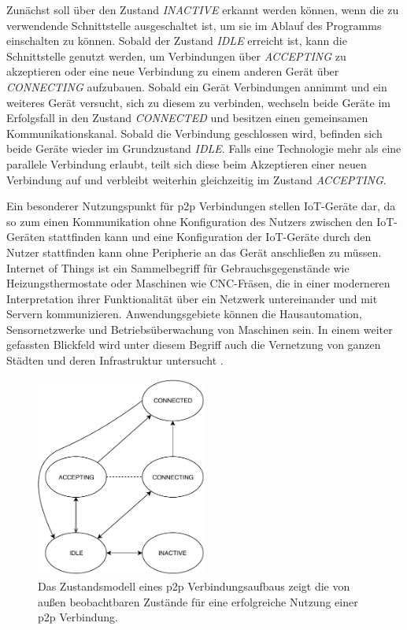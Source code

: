     Zunächst soll über den Zustand {\it INACTIVE} erkannt werden können, wenn die zu verwendende Schnittstelle ausgeschaltet ist, um sie im Ablauf des Programms einschalten zu können. Sobald der Zustand {\it IDLE} erreicht ist, kann die Schnittstelle genutzt werden, um Verbindungen über {\it ACCEPTING} zu akzeptieren oder eine neue Verbindung zu einem anderen Gerät über {\it CONNECTING} aufzubauen. Sobald ein Gerät Verbindungen annimmt und ein weiteres Gerät versucht, sich zu diesem zu verbinden, wechseln beide Geräte im Erfolgsfall in den Zustand {\it CONNECTED} und besitzen einen gemeinsamen Kommunikationskanal. Sobald die Verbindung geschlossen wird, befinden sich beide Geräte wieder im Grundzustand {\it IDLE}. Falls eine Technologie mehr als eine parallele Verbindung erlaubt, teilt sich diese beim Akzeptieren einer neuen Verbindung auf und verbleibt weiterhin gleichzeitig im Zustand {\it ACCEPTING}.

    Ein besonderer Nutzungspunkt für p2p Verbindungen stellen IoT-Geräte dar, da so zum einen Kommunikation ohne Konfiguration des Nutzers zwischen den IoT-Geräten stattfinden kann und eine Konfiguration der IoT-Geräte durch den Nutzer stattfinden kann ohne Peripherie an das Gerät anschließen zu müssen. Internet of Things ist ein Sammelbegriff für Gebrauchsgegenstände wie Heizungsthermostate oder Maschinen wie CNC-Fräsen, die in einer moderneren Interpretation ihrer Funktionalität über ein Netzwerk untereinander und mit Servern kommunizieren. Anwendungsgebiete können die Hausautomation, Sensornetzwerke und Betriebsüberwachung von Maschinen sein. In einem weiter gefassten Blickfeld wird unter diesem Begriff auch die Vernetzung von ganzen Städten und deren Infrastruktur untersucht \cite{ituGroup}.
    
    \begin{figure}[ht]
         \centering
	      \includegraphics[width=0.5\textwidth]{p2p-State.pdf}
    	   \caption[Zustandsmodell eines p2p Verbindungsaufbaus]{Das Zustandsmodell eines p2p Verbindungsaufbaus zeigt die von außen beobachtbaren Zustände für eine erfolgreiche Nutzung einer p2p Verbindung. } \label{p2p:state}
	\end{figure}       
    
